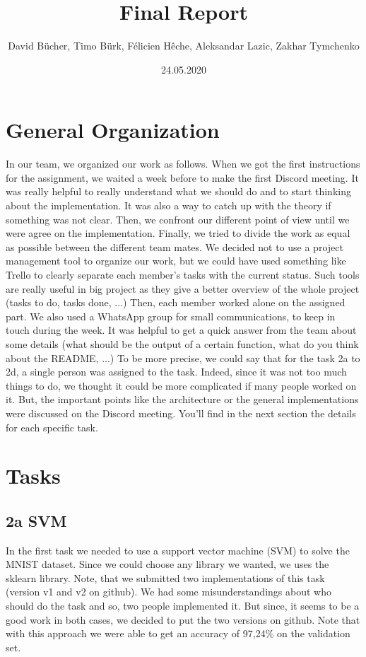 \documentclass[12pt]{article}
\begin{document}
\title{Final Report}
\author{David Bücher, Timo Bürk, Félicien Hêche, Aleksandar Lazic, Zakhar Tymchenko }
\date{24.05.2020}
\maketitle


\section*{General Organization}
In our team, we organized our work as follows.
\newline When we got the first instructions for the assignment, we waited a week before to make the first Discord meeting. It was really helpful to really understand what we should do and to start thinking about the implementation. It was also a way to catch up with the theory if something was not clear. Then, we confront our different point of view until we were agree on the implementation. Finally, we tried to divide the work as equal as possible between the different team mates.
\newline We decided not to use a project management tool to organize our work, but we could have used something like Trello to clearly separate each member's tasks with the current status. Such tools are really useful in big project as they give a better overview of the whole project (tasks to do, tasks done, ...)
\newline Then, each member worked alone on the assigned part. We also used a WhatsApp group for small communications, to keep in touch during the week. It was helpful to get a quick answer from the team about some details (what should be the output of a certain function, what do you think about the README, ...)
\newline  To be more precise, we could say that for the task 2a to 2d, a single person was assigned to the task. Indeed, since it was not too much things to do, we thought it could be more complicated if many people worked on it. But, the important points like the architecture or the general implementations were discussed on the Discord meeting. You'll find in the next section the details for each specific task. 
\section*{Tasks}
\subsection*{2a SVM}
In the first task we needed to use a support vector machine (SVM) to solve the MNIST dataset. Since we could choose any library we wanted, we uses the sklearn library. Note, that we submitted two implementations of this task (version v1 and v2 on github). We had some misunderstandings about who should do the task and so, two people implemented it. But since, it seems to be a good work in both cases, we decided to put the two versions on github. Note that with this approach we were able to get an accuracy of 97,24\% on the validation set.
\end{document}
